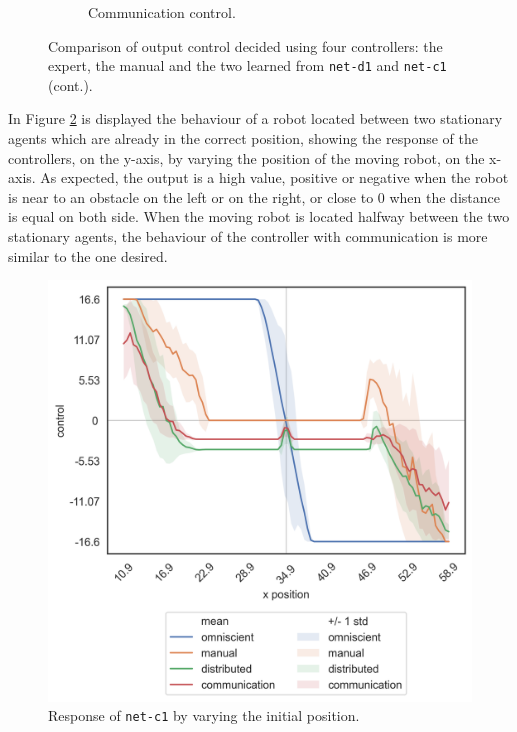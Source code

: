 \begin{figure}[!htb]
\begin{center}
\begin{subfigure}[h]{0.35\textwidth}
			\caption{Communication control.}
		\end{subfigure}
	\end{center}
	\vspace{-0.5cm}
	\caption[]{Comparison of output control decided using four controllers: the 
	expert, the manual and the two learned from \texttt{net-d1} and 
	\texttt{net-c1} (cont.).}
	\label{fig:net-c1control}
\end{figure}

In Figure \ref{fig:net-c1responseposition} is displayed the behaviour of a robot 
located between two stationary agents which are already in the correct position, 
showing the response of the controllers, on the y-axis, by varying the position of 
the moving robot, on the x-axis.  
As expected, the output is a high value, positive or negative when the robot is 
near to an obstacle on the left or on the right, or close to $0$ when the distance is 
equal on both side.
When the moving robot is located halfway between the two stationary agents, the 
behaviour of the controller with communication is more similar to the one desired.
\begin{figure}[!htb]
	\centering
	\includegraphics[width=.45\textwidth]{contents/images/net-c1/response-varying_init_position-communication}%
	\caption{Response of \texttt{net-c1} by varying the initial position.}
	\label{fig:net-c1responseposition}
\end{figure}

